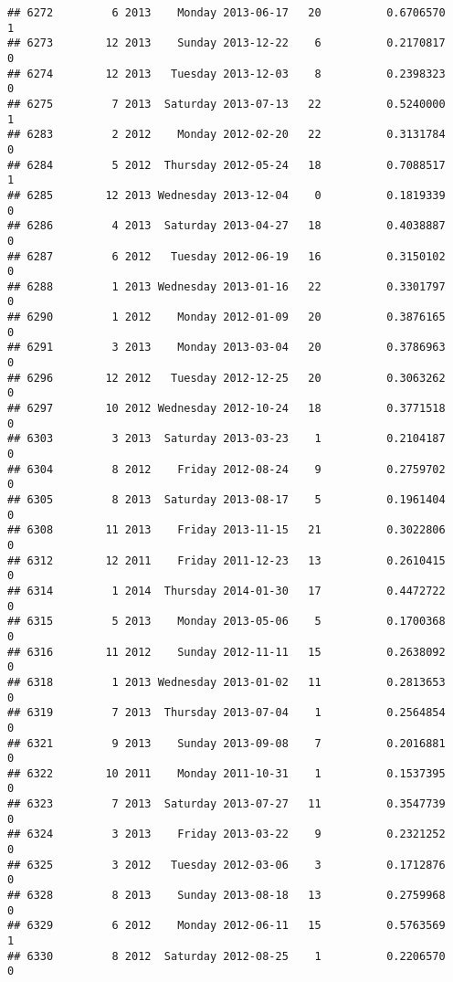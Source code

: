 \documentclass[
]{article}
\begin{document}
\begin{verbatim}
## 6272         6 2013    Monday 2013-06-17   20          0.6706570             1
## 6273        12 2013    Sunday 2013-12-22    6          0.2170817             0
## 6274        12 2013   Tuesday 2013-12-03    8          0.2398323             0
## 6275         7 2013  Saturday 2013-07-13   22          0.5240000             1
## 6283         2 2012    Monday 2012-02-20   22          0.3131784             0
## 6284         5 2012  Thursday 2012-05-24   18          0.7088517             1
## 6285        12 2013 Wednesday 2013-12-04    0          0.1819339             0
## 6286         4 2013  Saturday 2013-04-27   18          0.4038887             0
## 6287         6 2012   Tuesday 2012-06-19   16          0.3150102             0
## 6288         1 2013 Wednesday 2013-01-16   22          0.3301797             0
## 6290         1 2012    Monday 2012-01-09   20          0.3876165             0
## 6291         3 2013    Monday 2013-03-04   20          0.3786963             0
## 6296        12 2012   Tuesday 2012-12-25   20          0.3063262             0
## 6297        10 2012 Wednesday 2012-10-24   18          0.3771518             0
## 6303         3 2013  Saturday 2013-03-23    1          0.2104187             0
## 6304         8 2012    Friday 2012-08-24    9          0.2759702             0
## 6305         8 2013  Saturday 2013-08-17    5          0.1961404             0
## 6308        11 2013    Friday 2013-11-15   21          0.3022806             0
## 6312        12 2011    Friday 2011-12-23   13          0.2610415             0
## 6314         1 2014  Thursday 2014-01-30   17          0.4472722             0
## 6315         5 2013    Monday 2013-05-06    5          0.1700368             0
## 6316        11 2012    Sunday 2012-11-11   15          0.2638092             0
## 6318         1 2013 Wednesday 2013-01-02   11          0.2813653             0
## 6319         7 2013  Thursday 2013-07-04    1          0.2564854             0
## 6321         9 2013    Sunday 2013-09-08    7          0.2016881             0
## 6322        10 2011    Monday 2011-10-31    1          0.1537395             0
## 6323         7 2013  Saturday 2013-07-27   11          0.3547739             0
## 6324         3 2013    Friday 2013-03-22    9          0.2321252             0
## 6325         3 2012   Tuesday 2012-03-06    3          0.1712876             0
## 6328         8 2013    Sunday 2013-08-18   13          0.2759968             0
## 6329         6 2012    Monday 2012-06-11   15          0.5763569             1
## 6330         8 2012  Saturday 2012-08-25    1          0.2206570             0

\end{verbatim}
\end{document}

